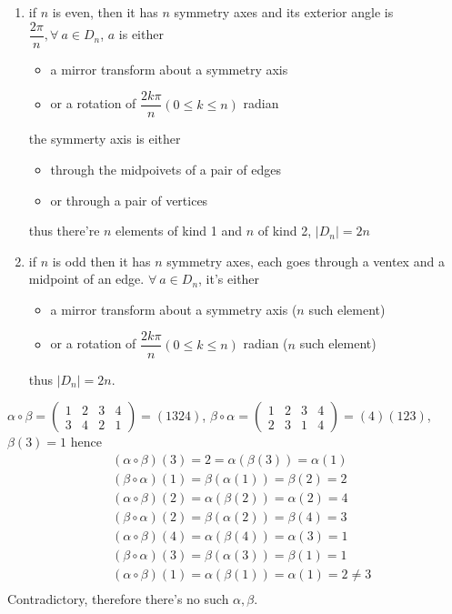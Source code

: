 \documentclass[11pt]{homework}
\newcommand{\fal}{\forall\ }
\begin{document}
\begin{alphaparts}
    \questionpart
    \begin{enumerate}
        \item if $n$ is even, then it has $n$ symmetry axes and its exterior angle is $\dfrac{2\pi}{n} , \fal a\in D_n$,  $a$ is either
              \begin{itemize}
                  \item a mirror transform about a symmetry axis
                  \item or a rotation of $\dfrac{2k\pi}{n} (0\leqslant k\leqslant n)$ radian
              \end{itemize}
              the symmerty axis is either
              \begin{itemize}
                  \item through the midpoivets of a pair of edges
                  \item or through a pair of vertices
              \end{itemize}
              thus there're $n$ elements of kind 1 and $n$ of kind 2, $|D_n|=2n$
        \item if $n$ is odd then it has $n$ symmetry axes, each goes through a ventex and a midpoint of an edge. $\fal a\in D_n$, it's either
              \begin{itemize}
                  \item a mirror transform about a symmetry axis ($n$ such element)
                  \item or a rotation of $\dfrac{2k\pi}{n} (0\leqslant k\leqslant n)$ radian ($n$ such element)
              \end{itemize}
              thus $|D_n|=2n$.
    \end{enumerate}
\end{alphaparts}

\question
$\alpha\circ\beta=\begin{pmatrix}1&2&3&4\\3&4&2&1\end{pmatrix}=(1324)$,
$\beta\circ\alpha=\begin{pmatrix}1&2&3&4\\2&3&1&4\end{pmatrix}=(4)(123)$, $\beta(3)=1$ hence
\begin{align*}
     & (\alpha\circ\beta)(3)=2=\alpha(\beta(3))=\alpha(1)       \\
     & (\beta\circ\alpha)(1)=\beta(\alpha(1))=\beta(2)=2        \\
     & (\alpha\circ\beta)(2)=\alpha(\beta(2))=\alpha(2)=4       \\
     & (\beta\circ\alpha)(2)=\beta(\alpha(2))=\beta(4)=3        \\
     & (\alpha\circ\beta)(4)=\alpha(\beta(4))=\alpha(3)=1       \\
     & (\beta\circ\alpha)(3)=\beta(\alpha(3))=\beta(1)=1        \\
     & (\alpha\circ\beta)(1)=\alpha(\beta(1))=\alpha(1)=2\neq 3 \\
\end{align*}
Contradictory, therefore there's no such $\alpha,\beta$.
\end{document}
